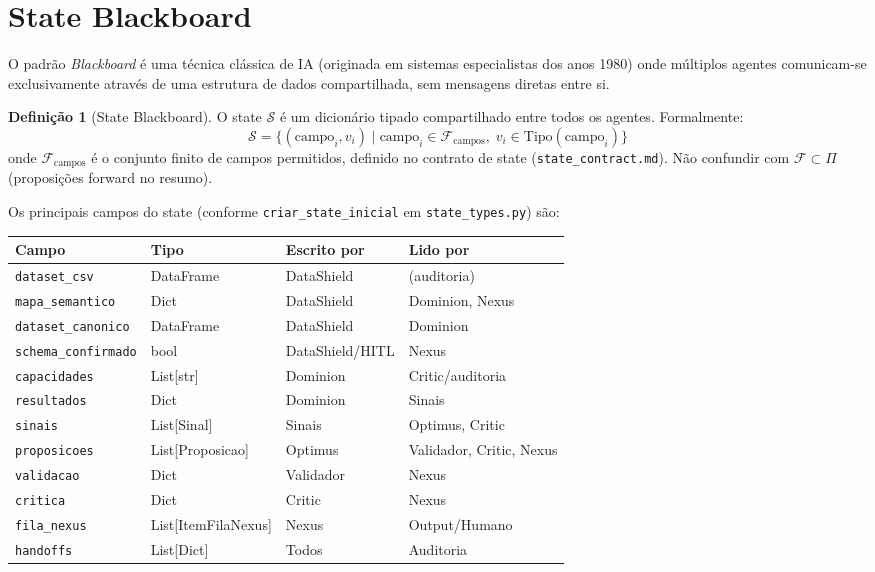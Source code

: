 \documentclass[a4paper, 12pt]{report}
\theoremstyle{definition}
\newtheorem{definicao}{Defini\c{c}\~ao}[chapter]
\theoremstyle{remark}
\newcommand{\state}{\mathcal{S}}
\begin{document}
\section{State Blackboard}

O padr\~ao \textit{Blackboard} \'e uma t\'ecnica cl\'assica de IA (originada
em sistemas especialistas dos anos 1980) onde m\'ultiplos agentes
comunicam-se exclusivamente atrav\'es de uma estrutura de dados
compartilhada, sem mensagens diretas entre si.

\begin{definicao}[State Blackboard]
  O state $\state$ \'e um dicion\'ario tipado compartilhado entre todos os
  agentes. Formalmente:
  \[
    \state = \{(\text{campo}_i, v_i) \mid
      \text{campo}_i \in \mathcal{F}_{\text{campos}},\;
      v_i \in \text{Tipo}(\text{campo}_i)\}
  \]
  onde $\mathcal{F}_{\text{campos}}$ \'e o conjunto finito de campos
  permitidos, definido no contrato de state
  (\texttt{state\_contract.md}). N\~ao confundir com
  $\mathcal{F}\subset\Pi$ (proposi\c{c}\~oes forward no resumo).
\end{definicao}

Os principais campos do state (conforme \texttt{criar\_state\_inicial}
em \texttt{state\_types.py}) s\~ao:

\begin{center}
\begin{tabular}{llll}
  \toprule
  \textbf{Campo} & \textbf{Tipo} & \textbf{Escrito por} & \textbf{Lido por} \\
  \midrule
  \texttt{dataset\_csv} & DataFrame & DataShield & (auditoria) \\
  \texttt{mapa\_semantico} & Dict & DataShield & Dominion, Nexus \\
  \texttt{dataset\_canonico} & DataFrame & DataShield & Dominion \\
  \texttt{schema\_confirmado} & bool & DataShield/HITL & Nexus \\
  \texttt{capacidades} & List[str] & Dominion & Critic/auditoria \\
  \texttt{resultados} & Dict & Dominion & Sinais \\
  \texttt{sinais} & List[Sinal] & Sinais & Optimus, Critic \\
  \texttt{proposicoes} & List[Proposicao] & Optimus & Validador, Critic, Nexus \\
  \texttt{validacao} & Dict & Validador & Nexus \\
  \texttt{critica} & Dict & Critic & Nexus \\
  \texttt{fila\_nexus} & List[ItemFilaNexus] & Nexus & Output/Humano \\
  \texttt{handoffs} & List[Dict] & Todos & Auditoria \\
  \bottomrule
\end{tabular}
\end{center}
\end{document}
